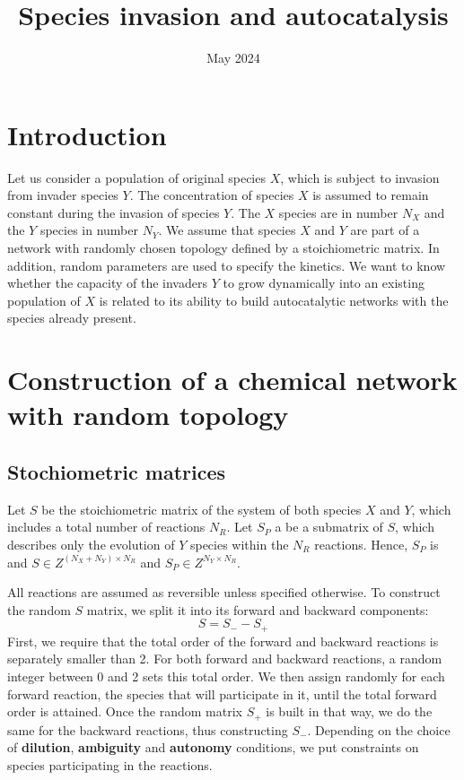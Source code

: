 \documentclass{article}
\begin{document}
\title{Species invasion and autocatalysis}
\date{May 2024}


\maketitle

\section{Introduction}
Let us consider a population of original species $X$, which is subject to invasion from invader species $Y$. The concentration of species $X$ is assumed to remain constant during the invasion of species $Y$. The $X$ species are in number $N_X$ and the $Y$ species in number $N_Y$. We assume that species $X$ and $Y$ are part of a network with randomly chosen topology defined by a stoichiometric matrix. In addition, random parameters are used to specify the kinetics.  We want to know whether the capacity of the invaders $Y$ to grow dynamically into an existing population of $X$ is related to its ability to build autocatalytic networks with the species already present. 

\section{Construction of a chemical network with random topology}
\subsection{Stochiometric matrices}
Let $S$ be the stoichiometric matrix of the system of both species $X$ and $Y$, which  includes a total number of reactions $N_R$. Let $S_P$ a be a submatrix of $S$, which describes only the evolution of $Y$ species within the $N_R$ reactions. Hence, $S_P$ is and $S \in Z^{(N_X+N_Y) \times N_R}$ and 
$S_P \in  Z^{N_Y \times N_R}$.

All reactions are assumed as reversible unless specified otherwise. To construct the random $S$ matrix, we split it into its forward and backward components:
\begin{equation}
    S= S_- - S_+
\end{equation}
First, we require that the total order of the forward and backward reactions is separately smaller than 2. For both forward and backward reactions, a random integer between 0 and 2 sets this total order. We then assign randomly for each forward reaction, the species that will participate in it, until the total forward order is attained. Once the random matrix $S_+$ is built in that way, we do the same for the backward reactions, thus constructing $S_-$. Depending on the choice of \textbf{dilution}, \textbf{ambiguity} and \textbf{autonomy} conditions, we put constraints on species participating in the reactions.
\end{document}
